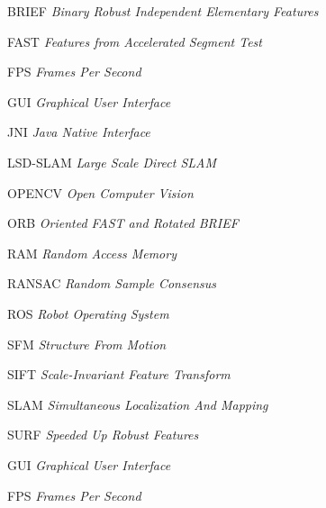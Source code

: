 
\begin{siglas}
\item[BRIEF]\textit{Binary Robust Independent Elementary Features}
\item[FAST]\textit{Features from Accelerated Segment Test}
\item[FPS]\textit{Frames Per Second}
\item[GUI]\textit{Graphical User Interface}
\item[JNI]\textit{Java Native Interface}
\item[LSD-SLAM]\textit{Large Scale Direct SLAM} 
\item[OPENCV]\textit{Open Computer Vision}
\item[ORB]\textit{Oriented FAST and Rotated BRIEF}
\item[RAM]\textit{Random Access Memory}
\item[RANSAC]\textit{Random Sample Consensus}
\item[ROS]\textit{Robot Operating System}
\item[SFM]\textit{Structure From Motion}
\item[SIFT]\textit{Scale-Invariant Feature Transform}
\item[SLAM]\textit{Simultaneous Localization And Mapping}
\item[SURF]\textit{Speeded Up Robust Features}
\item[GUI]\textit{Graphical User Interface}
\item[FPS]\textit{Frames Per Second}

\end{siglas}
